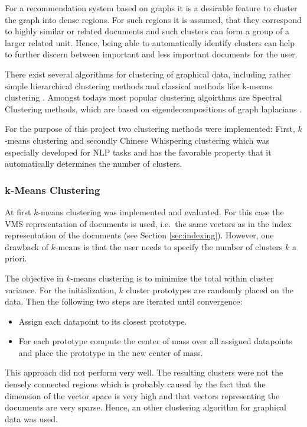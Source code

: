 For a recommendation system based on graphs it is a desirable feature to cluster the graph into
dense regions. For such regions it is assumed, that they correspond to highly similar or related
documents and such clusters can form a group of a larger related unit. Hence, being able to
automatically identify clusters can help to further discern between important and less important
documents for the user.

There exist several algorithms for clustering of graphical data, including rather simple
hierarchical clustering methods and classical methods like k-means clustering
\cite{eosl2}. Amongst todays most popular clustering algoirthms are Spectral Clustering
methods, which are based on eigendecompositions of graph laplacians \cite{spectral_clustering}.

For the purpose of this project two clustering methods were implemented: First, $k$-means clustering
and secondly Chinese Whispering clustering which was especially developed for NLP tasks and has the
favorable property that it automatically determines the number of clusters.

\subsubsection{k-Means Clustering}
\label{sec:k-means_clustering}
At first $k$-means clustering was implemented and evaluated. For this case the VMS representation of
documents is used, i.e.\ the same vectors as in the index representation of the documents (see
Section \ref{sec:indexing}). However, one drawback of $k$-means is that the user needs to specify
the number of clusters $k$ a priori.

The objective in $k$-means clustering is to minimize the total within cluster variance. For the
initialization, $k$ cluster prototypes are randomly placed on the data. Then the following two
steps are iterated until convergence:
\begin{itemize}
  \item Assign each datapoint to its closest prototype.
  \item For each prototype compute the center of mass over all assigned datapoints and place the
prototype in the new center of mass.
\end{itemize}

This approach did not perform very well. The resulting clusters were not the densely connected
regions which is probably caused by the fact that the dimension of the vector space is very high
and that vectors representing the documents are very sparse. Hence, an other clustering algorithm
for graphical data was used.

